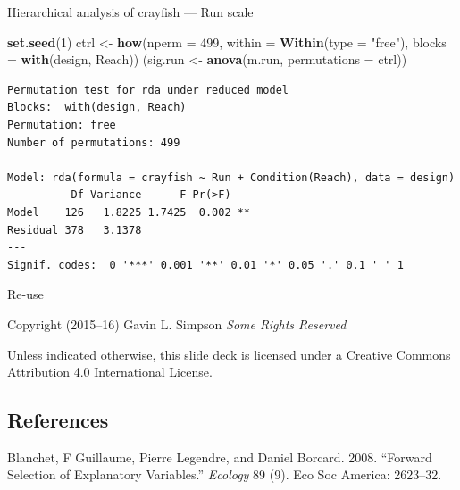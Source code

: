 \documentclass[10pt,ignorenonframetext,compress, aspectratio=169]{beamer}
\newenvironment{Shaded}{\begin{snugshade}}{\end{snugshade}}
\newcommand{\KeywordTok}[1]{\textcolor[rgb]{0.13,0.29,0.53}{\textbf{{#1}}}}
\newcommand{\DataTypeTok}[1]{\textcolor[rgb]{0.13,0.29,0.53}{{#1}}}
\newcommand{\DecValTok}[1]{\textcolor[rgb]{0.00,0.00,0.81}{{#1}}}
\newcommand{\StringTok}[1]{\textcolor[rgb]{0.31,0.60,0.02}{{#1}}}
\newcommand{\NormalTok}[1]{{#1}}
\begin{document}
\begin{frame}[fragile]{Hierarchical analysis of crayfish --- Run scale}

\scriptsize

\begin{Shaded}
\begin{Highlighting}[]
\KeywordTok{set.seed}\NormalTok{(}\DecValTok{1}\NormalTok{)}
\NormalTok{ctrl <-}\StringTok{ }\KeywordTok{how}\NormalTok{(}\DataTypeTok{nperm =} \DecValTok{499}\NormalTok{, }\DataTypeTok{within =} \KeywordTok{Within}\NormalTok{(}\DataTypeTok{type =} \StringTok{"free"}\NormalTok{),}
            \DataTypeTok{blocks =} \KeywordTok{with}\NormalTok{(design, Reach))}
\NormalTok{(sig.run <-}\StringTok{ }\KeywordTok{anova}\NormalTok{(m.run, }\DataTypeTok{permutations =} \NormalTok{ctrl))}
\end{Highlighting}
\end{Shaded}

\begin{verbatim}
Permutation test for rda under reduced model
Blocks:  with(design, Reach) 
Permutation: free
Number of permutations: 499

Model: rda(formula = crayfish ~ Run + Condition(Reach), data = design)
          Df Variance      F Pr(>F)   
Model    126   1.8225 1.7425  0.002 **
Residual 378   3.1378                 
---
Signif. codes:  0 '***' 0.001 '**' 0.01 '*' 0.05 '.' 0.1 ' ' 1
\end{verbatim}

\normalsize

\end{frame}

\begin{frame}{Re-use}

Copyright \textcopyright (2015--16) Gavin L. Simpson \emph{Some Rights
Reserved}

Unless indicated otherwise, this slide deck is licensed under a
\href{http://creativecommons.org/licenses/by/4.0/}{Creative Commons
Attribution 4.0 International License}.

\begin{center}
  \ccby
\end{center}

\subsection*{References}\label{references}

Blanchet, F Guillaume, Pierre Legendre, and Daniel Borcard. 2008.
``Forward Selection of Explanatory Variables.'' \emph{Ecology} 89 (9).
Eco Soc America: 2623--32.

\end{frame}
\end{document}
